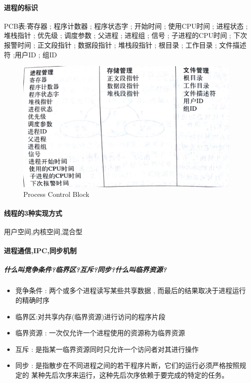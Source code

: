 \documentclass[UTF8,a4paper]{ctexart}
\begin{document}
\paragraph{进程的标识} PCB表:寄存器 ; 程序计数器 ; 程序状态字 ; 开始时间 ; 使用CPU时间 ; 进程状态 ; 堆栈指针 ; 优先级 ; 调度参数 ; 父进程 ; 进程组 ; 信号 ; 子进程的CPU时间 ; 下次报警时间 ; 正文段指针 ; 数据段指针 ; 堆栈段指针 ; 根目录 ; 工作目录 ; 文件描述符 ;用户ID ; 组ID
\begin{figure}[H]
	\centering
	\includegraphics[scale = 0.1]{assets/ModernOperatingSystems_e6663.png}
	\caption{Process Control Block}
	\label{fig-PCB}
\end{figure}

\paragraph{线程的3种实现方式}用户空间,内核空间,混合型

\paragraph{进程通信,IPC,同步机制} 

\subparagraph{什么叫竞争条件?临界区?互斥?同步?什么叫临界资源?}
\begin{itemize}
	\item 竞争条件 : 两个或多个进程读写某些共享数据 , 而最后的结果取决于进程运行的精确时序
	\item 临界区:对共享内存(临界资源)进行访问的程序片段
	\item 临界资源 : 一次仅允许一个进程使用的资源称为临界资源
	\item 互斥 : 是指某一临界资源同时只允许一个访问者对其进行操作
	\item 同步 : 是指散步在不同进程之间的若干程序片断，它们的运行必须严格按照规定的 某种先后次序来运行，这种先后次序依赖于要完成的特定的任务。
\end{itemize}
\end{document}
